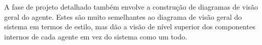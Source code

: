 \begin{itemize}
A fase de projeto detalhado também envolve a construção de diagramas de visão geral do agente. Estes são muito semelhantes ao diagrama de visão geral do sistema em termos de estilo, mas dão a visão de nível superior dos componentes internos de cada agente em vez do sistema como um todo.

%
\end{itemize}